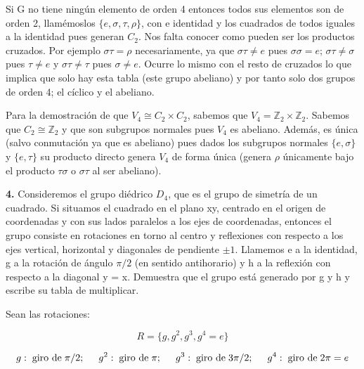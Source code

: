 \documentclass{article}
\begin{document}
Si G no tiene ningún elemento de orden 4 entonces todos sus elementos son de orden 2, llamémoslos $\lbrace e,\sigma ,\tau ,\rho \rbrace$, con e identidad y los cuadrados de todos iguales a la identidad pues generan $C_2$. Nos falta conocer como pueden ser los productos cruzados. Por ejemplo $\sigma \tau =\rho$ necesariamente, ya que $\sigma \tau \neq e$ pues $\sigma \sigma =e$; $\sigma \tau \neq \sigma$ pues $\tau \neq e$ y $\sigma \tau \neq \tau$ pues $\sigma \neq e$. Ocurre lo mismo con el resto de cruzados lo que implica que solo hay esta tabla (este grupo abeliano) y por tanto solo dos grupos de orden 4; el cíclico y el abeliano.

\smallskip
Para la demostración de que $V_4\cong C_2 \times C_2$, sabemos que $V_4=\mathds{Z}_2 \times \mathds{Z}_2$. Sabemos que $C_2\cong \mathds{Z}_2$ y que son subgrupos normales pues $V_4$ es abeliano. Además, es única (salvo conmutación ya que es abeliano) pues dados los subgrupos normales $\lbrace e, \sigma \rbrace$ y $\lbrace e, \tau \rbrace$ su producto directo genera $V_4$ de forma única (genera $\rho$ únicamente bajo el producto $\tau \sigma$ o $\sigma \tau$ al ser abeliano).

\bigskip
\textbf{4.} Consideremos el grupo diédrico $D_4$, que es el grupo de simetría de un cuadrado. Si situamos el cuadrado en el
plano xy, centrado en el origen de coordenadas y con sus lados paralelos a los ejes de coordenadas, entonces el
grupo consiste en rotaciones en torno al centro y reflexiones con respecto a los ejes vertical, horizontal y diagonales
de pendiente $\pm 1$. Llamemos e a la identidad, g a la rotación de ángulo $\pi/2$ (en sentido antihorario) y h a la reflexión
con respecto a la diagonal y = x. Demuestra que el grupo está generado por g y h y escribe su tabla de multiplicar.

\smallskip

Sean las rotaciones:

$$R=\lbrace  g,g^2,g^3,g^4=e\rbrace$$

$$g: \hspace{0.1cm} \text{giro de} \hspace{0.1cm} \pi/2; \hspace{0.5cm} g^2: \hspace{0.1cm} \text{giro de} \hspace{0.1cm} \pi; \hspace{0.5cm} g^3: \hspace{0.1cm} \text{giro de} \hspace{0.1cm} 3\pi /2; \hspace{0.5cm} g^4 :  \hspace{0.1cm} \text{giro de} \hspace{0.1cm} 2\pi=e$$
\end{document}
